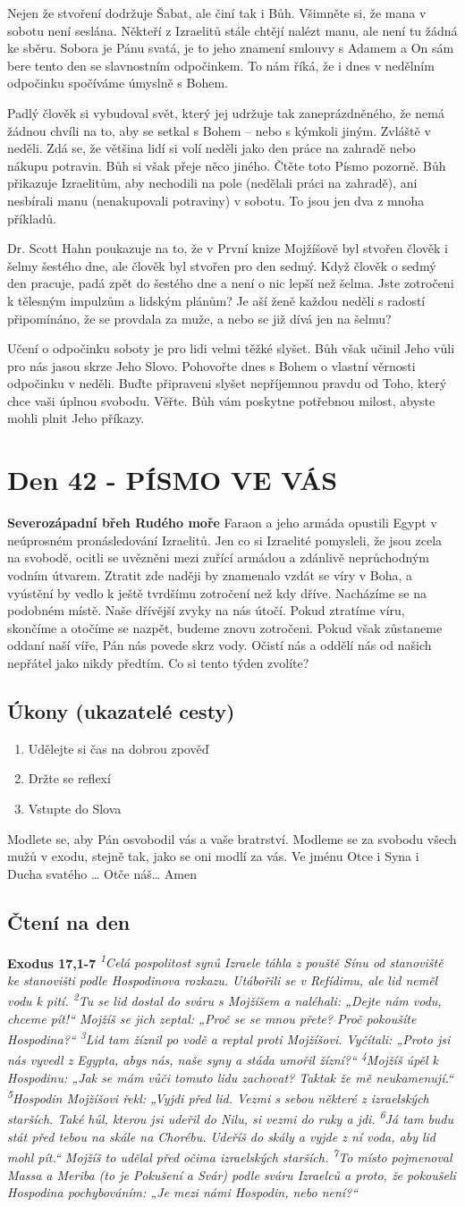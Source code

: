 \documentclass[11pt]{article}
\newcommand{\zacatekSestyTyden}{
  \textbf{Severozápadní břeh Rudého moře} \newline 
  Faraon a jeho armáda opustili Egypt v neúprosném pronásledování Izraelitů. Jen co si Izraelité pomysleli, že jsou zcela na svobodě, ocitli se uvězněni mezi zuřící armádou a zdánlivě neprůchodným vodním útvarem. Ztratit zde naději by znamenalo vzdát se víry v Boha, a vyústění by vedlo k ještě tvrdšímu zotročení než kdy dříve. Nacházíme se na podobném místě. Naše dřívější zvyky na nás útočí. Pokud ztratíme víru, skončíme a otočíme se nazpět, budeme znovu zotročeni. Pokud však zůstaneme oddaní naší víře, Pán nás povede skrz vody. Očistí nás a oddělí nás od našich nepřátel jako nikdy předtím. Co si tento týden zvolíte?

\subsection*{Úkony (ukazatelé cesty)}
\begin{enumerate}
  \item Udělejte si čas na dobrou zpověď
  \item Držte se reflexí
  \item Vstupte do Slova
\end{enumerate}
Modlete se, aby Pán osvobodil vás a vaše bratrství. \newline
Modleme se za svobodu všech mužů v exodu, stejně tak, jako se oni modlí za vás.\newline
Ve jménu Otce i Syna i Ducha svatého …  Otče náš… Amen
}
\begin{document}
Nejen že stvoření dodržuje Šabat, ale činí tak i Bůh. Všimněte si, že mana v sobotu není seslána. Někteří z Izraelitů
stále chtějí nalézt manu, ale není tu žádná ke sběru. Sobora je Pánu svatá, je to jeho znamení smlouvy s Adamem a On
sám bere tento den se slavnostním odpočinkem. To nám říká, že i dnes v nedělním odpočinku spočíváme úmyslně
s Bohem.

Padlý člověk si vybudoval svět, který jej udržuje tak zaneprázdněného, že nemá žádnou chvíli na to, aby se setkal
s Bohem – nebo s kýmkoli jiným. Zvláště v neděli. Zdá se, že většina lidí si volí neděli jako den práce na zahradě nebo
nákupu potravin. Bůh si však přeje něco jiného. Čtěte toto Písmo pozorně. Bůh přikazuje Izraelitům, aby nechodili na
pole (nedělali práci na zahradě), ani nesbírali manu (nenakupovali potraviny) v sobotu. To jsou jen dva z mnoha
příkladů.

Dr. Scott Hahn poukazuje na to, že v První knize Mojžíšově byl stvořen člověk i šelmy šestého dne, ale člověk byl
stvořen pro den sedmý. Když člověk o sedmý den pracuje, padá zpět do šestého dne a není o nic lepší než šelma. Jste
zotročeni k tělesným impulzům a lidským plánům? Je aší ženě každou neděli s radostí připomínáno, že se provdala za
muže, a nebo se již dívá jen na šelmu?

Učení o odpočinku soboty je pro lidi velmi těžké slyšet. Bůh však učinil Jeho vůli pro nás jasou skrze Jeho Slovo.
Pohovořte dnes s Bohem o vlastní věrnosti odpočinku v neděli. Buďte připraveni slyšet nepříjemnou pravdu od Toho,
který chce vaši úplnou svobodu. Věřte. Bůh vám poskytne potřebnou milost, abyste mohli plnit Jeho příkazy.


\newpage
\section{Den 42 - PÍSMO VE VÁS}
\zacatekSestyTyden
\subsection*{Čtení na den}
\textbf{Exodus 17,1-7}
\newline
\textit{
\textsuperscript{1}Celá pospolitost synů Izraele táhla z pouště Sínu od stanoviště ke stanovišti podle Hospodinova rozkazu. Utábořili se v Refídimu, ale lid neměl vodu k pití.
\textsuperscript{2}Tu se lid dostal do sváru s Mojžíšem a naléhali: „Dejte nám vodu, chceme pít!“ Mojžíš se jich zeptal: „Proč se se mnou přete? Proč pokoušíte Hospodina?“
\textsuperscript{3}Lid tam žíznil po vodě a reptal proti Mojžíšovi. Vyčítali: „Proto jsi nás vyvedl z Egypta, abys nás, naše syny a stáda umořil žízní?“
\textsuperscript{4}Mojžíš úpěl k Hospodinu: „Jak se mám vůči tomuto lidu zachovat? Taktak že mě neukamenují.“
\textsuperscript{5}Hospodin Mojžíšovi řekl: „Vyjdi před lid. Vezmi s sebou některé z izraelských starších. Také hůl, kterou jsi udeřil do Nilu, si vezmi do ruky a jdi.
\textsuperscript{6}Já tam budu stát před tebou na skále na Chorébu. Udeříš do skály a vyjde z ní voda, aby lid mohl pít.“ Mojžíš to udělal před očima izraelských starších.
\textsuperscript{7}To místo pojmenoval Massa a Meriba (to je Pokušení a Svár) podle sváru Izraelců a proto, že pokoušeli Hospodina pochybováním: „Je mezi námi Hospodin, nebo není?“
}
\end{document}
